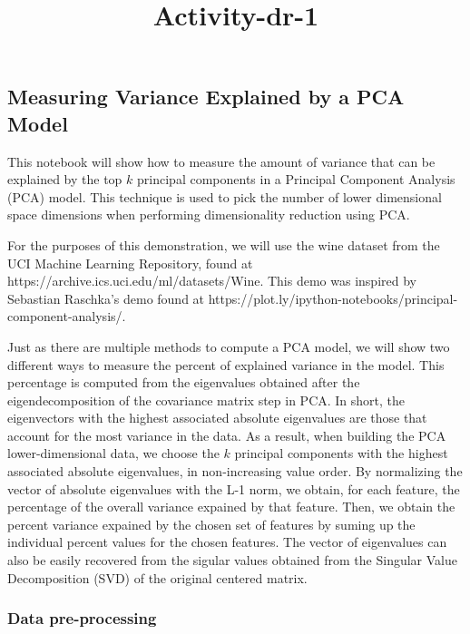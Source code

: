 \documentclass[11pt]{article}
\title{Activity-dr-1}
\begin{document}
    
    
    \maketitle
    
    

    
    \subsection{Measuring Variance Explained by a PCA
Model}\label{measuring-variance-explained-by-a-pca-model}

This notebook will show how to measure the amount of variance that can
be explained by the top \(k\) principal components in a Principal
Component Analysis (PCA) model. This technique is used to pick the
number of lower dimensional space dimensions when performing
dimensionality reduction using PCA.

For the purposes of this demonstration, we will use the wine dataset
from the UCI Machine Learning Repository, found at
https://archive.ics.uci.edu/ml/datasets/Wine. This demo was inspired by
Sebastian Raschka's demo found at
https://plot.ly/ipython-notebooks/principal-component-analysis/.

Just as there are multiple methods to compute a PCA model, we will show
two different ways to measure the percent of explained variance in the
model. This percentage is computed from the eigenvalues obtained after
the eigendecomposition of the covariance matrix step in PCA. In short,
the eigenvectors with the highest associated absolute eigenvalues are
those that account for the most variance in the data. As a result, when
building the PCA lower-dimensional data, we choose the \(k\) principal
components with the highest associated absolute eigenvalues, in
non-increasing value order. By normalizing the vector of absolute
eigenvalues with the L-1 norm, we obtain, for each feature, the
percentage of the overall variance expained by that feature. Then, we
obtain the percent variance expained by the chosen set of features by
suming up the individual percent values for the chosen features. The
vector of eigenvalues can also be easily recovered from the sigular
values obtained from the Singular Value Decomposition (SVD) of the
original centered matrix.

\subsubsection{Data pre-processing}\label{data-pre-processing}
\end{document}
